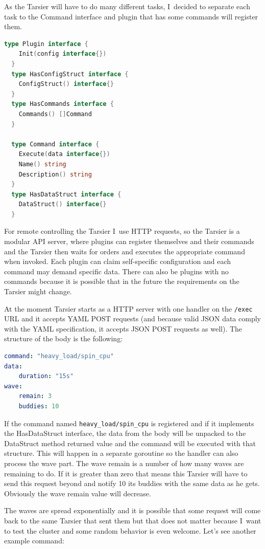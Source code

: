 As the Tarsier will have to do many different tasks, I~decided to separate each task to the Command interface and plugin that has some commands will register them.

\begin{lstlisting}[language=go,caption=Tarsier plugin's interfaces]
  type Plugin interface {
  	Init(config interface{})
  }
  type HasConfigStruct interface {
  	ConfigStruct() interface{}
  }
  type HasCommands interface {
  	Commands() []Command
  }
  
  type Command interface {
  	Execute(data interface{})
  	Name() string
  	Description() string
  }
  type HasDataStruct interface {
  	DataStruct() interface{}
  }
\end{lstlisting}

For remote controlling the Tarsier I~use HTTP requests, so the Tarsier is a modular API server, where plugins can register themselves and their commands and the Tarsier then waits for orders and executes the appropriate command when invoked. Each plugin can claim self-specific configuration and each command may demand specific data. There can also be plugins with no commands because it is possible that in the future the requirements on the Tarsier might change.

At the moment Tarsier starts as a HTTP server with one handler on the 
\lstinline{/exec} URL and it accepts YAML POST requests (and because valid JSON data comply with the YAML specification, it accepts JSON POST requests as well). The structure of the body is the following:
\pagebreak
\begin{lstlisting}[language=yaml,caption=Command 'spin\_cpu' body structure]
command: "heavy_load/spin_cpu"
data:
    duration: "15s"
wave: 
    remain: 3
    buddies: 10
\end{lstlisting}


If the command named \lstinline{heavy_load/spin_cpu} is registered and if it implements the HasDataStruct interface, the data from the body will be unpacked to the DataStruct method returned value and the command will be executed with that structure. This will happen in a separate goroutine so the handler can also process the wave part. The wave remain is a number of how many waves are remaining to do. If it is greater than zero that means this Tarsier will have to send this request beyond and notify 10 its buddies with the same data as he gets. Obviously the wave remain value will decrease.

The waves are spread exponentially and it is possible that some request will come back to the same Tarsier that sent them but that does not matter because I~want to test the cluster and some random behavior is even welcome. Let’s see another example command:
 
